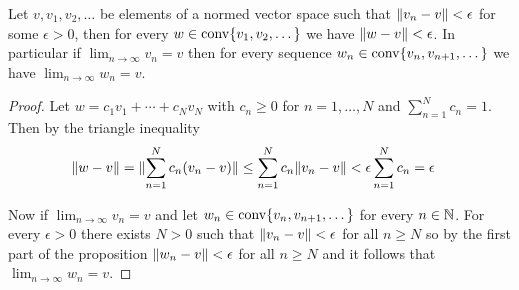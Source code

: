 \begin{prop}\label{LimitsOfConvexCombinations}Let $v, v_1, v_2, \dotsc$ be elements of a normed vector space such that $\lVert v_n - v \rVert < \epsilon$ for some $\epsilon > 0$, then for every $w \in \operatorname*{conv}\{v_1, v_2, \dotsc\}$ we have $\lVert w - v \rVert < \epsilon$.  In particular if $\lim_{n \to \infty} v_n = v$ then for every sequence $w_n \in \operatorname*{conv}\{v_n, v_{n+1}, \dotsc\}$ we have $\lim_{n \to \infty} w_n = v$.
\end{prop}
\begin{proof}
Let $w = c_1 v_1 + \dotsb + c_N v_N$ with $c_n \geq 0$ for $n=1, \dotsc, N$ and $\sum_{n=1}^N c_n =1$.  Then by the triangle inequality
\begin{align*}
\lVert w - v \rVert &= \lVert \sum_{n=1}^N c_n (v_n - v) \rVert \leq \sum_{n=1}^N c_n \lVert v_n - v \rVert < \epsilon \sum_{n=1}^N c_n = \epsilon
\end{align*}

Now if $\lim_{n \to \infty} v_n = v$ and let $w_n \in \operatorname*{conv}\{v_n, v_{n+1}, \dotsc\}$ for every $n \in \mathbb{N}$.  For every $\epsilon > 0$ there exists $N > 0$ such that $\lVert v_n - v \rVert < \epsilon$ for all $n \geq N$ so by the first part of the proposition $\lVert w_n - v \rVert < \epsilon$ for all $n \geq N$ and it follows that $\lim_{n \to \infty} w_n = v$.
\end{proof}

